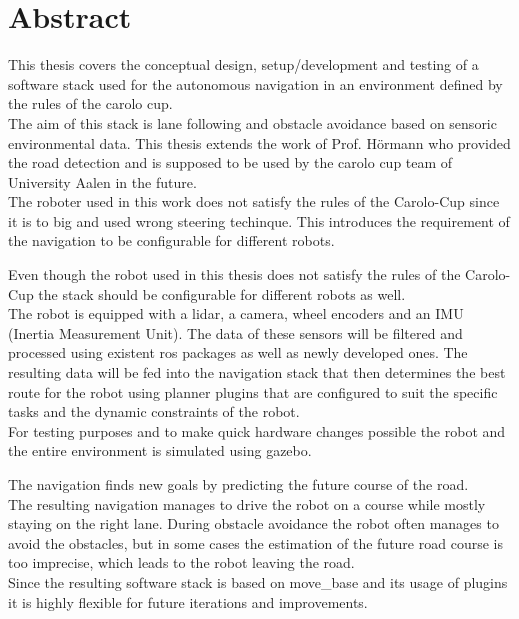 \chapter*{Abstract}
\label{abstract}
This thesis covers the conceptual design, setup/development and testing of a software stack used for the autonomous navigation in an environment defined by the rules of the carolo cup.\\

 The aim of this stack is lane following and obstacle avoidance based on sensoric environmental data. This thesis extends the work of Prof. Hörmann who provided the road detection and is supposed to be used by the carolo cup team of University Aalen in the future.\\
 The roboter used in this work does not satisfy the rules of the Carolo-Cup since it is to big and used wrong steering techinque. This introduces the requirement of the navigation to be configurable for different robots.
 
 Even though the robot used in this thesis does not satisfy the rules of the Carolo-Cup the stack should be configurable for different robots as well.\\
The robot is equipped with a lidar, a camera, wheel encoders and an IMU (Inertia Measurement Unit). The data of these sensors will be filtered and processed using existent ros packages as well as newly developed ones. The resulting data will be fed into the navigation stack that then determines the best route for the robot using planner plugins that are configured to suit the specific tasks and the dynamic constraints of the robot.\\

For testing purposes and to make quick hardware changes possible the robot and the entire environment is simulated using gazebo.\\

The navigation finds new goals by predicting the future course of the road.\\

The resulting navigation manages to drive the robot on a course while mostly staying on the right lane. During obstacle avoidance the robot often manages to avoid the obstacles, but in some cases the estimation of the future road course is too imprecise, which leads to the robot leaving the road.\\

Since the resulting software stack is based on move\_base and its usage of plugins it is highly flexible for future iterations and improvements.\\